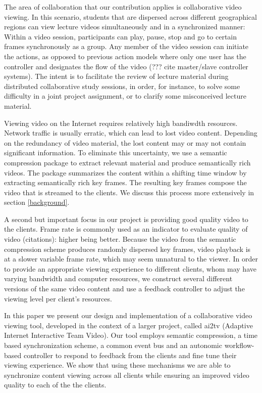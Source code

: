 \documentclass{sig-alternate}
\begin{document}
The area of collaboration that our contribution applies is
collaborative video viewing.  In this scenario, students that are
dispersed across different geographical regions can view lecture
videos simultaneously and in a synchronized manner: Within a video
session, participants can play, pause, stop and go to certain frames
synchronously as a group.  Any member of the video session can
initiate the actions, as opposed to previous action models where only
one user has the controller and designates the flow of the video (???
cite master/slave controller systems).  The intent is to facilitate
the review of lecture material during distributed collaborative study
sessions, in order, for instance, to solve some difficulty in a joint
project assignment, or to clarify some misconceived lecture material.

Viewing video on the Internet requires relatively high bandiwdth
resources.  Network traffic is usually erratic, which can lead to lost
video content. Depending on the redundancy of video material, the lost
content may or may not contain significant information.  To eliminate
this uncertainty, we use a semantic compression package
\cite{TIECHENG} to extract relevant material and produce semantically
rich videos.  The package summarizes the content within a shifting
time window by extracting semantically rich key frames.  The resulting
key frames compose the video that is streamed to the clients.  We
discuss this process more extensively in section \ref{background}.

A second but important focus in our project is providing good quality
video to the clients.  Frame rate is commonly used as an indicator to
evaluate quality of video (citations): higher being better.  Because
the video from the semantic compression scheme produces randomly
dispersed key frames, video playback is at a slower variable frame
rate, which may seem unnatural to the viewer.  In order to provide an
appropriate viewing experience to different clients, whom may have
varying bandwidth and computer resources, we construct several
different versions of the same video content and use a feedback
controller to adjust the viewing level per client's resources.

In this paper we present our design and implementation of a
collaborative video viewing tool, developed in the context of a larger
project, called ai2tv (Adaptive Internet Interactive Team
Video).  Our tool employs semantic compression, a time based
synchronization scheme, a common event bus and an autonomic
workflow-based controller to respond to feedback from the clients and
fine tune their viewing experience.  We show that using these
mechanisms we are able to synchronize content viewing across all
clients while ensuring an improved video quality to each of the the
clients.
\end{document}
